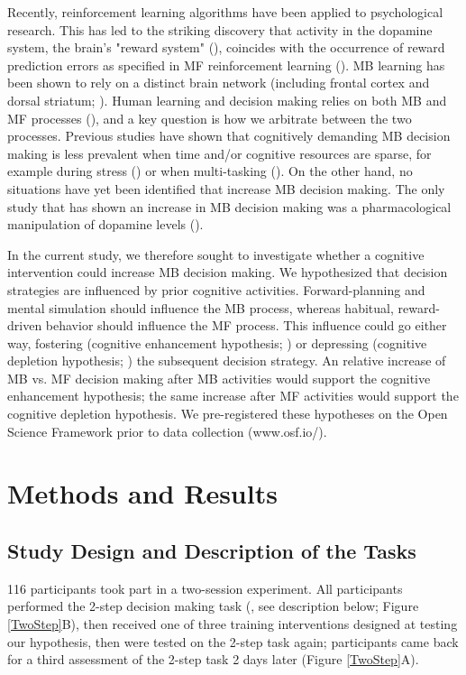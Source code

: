 \documentclass[11pt]{article} %
\begin{document}
Recently, reinforcement learning algorithms have been applied to psychological research. This has led to the striking discovery that activity in the dopamine system, the brain's "reward system" (\cite{wise_brain_1989}), coincides with the occurrence of reward prediction errors as specified in MF reinforcement learning (\cite{schultz_neural_1997}). MB learning has been shown to rely on a distinct brain network (including frontal cortex and dorsal striatum; \cite{dolan_goals_2013}). Human learning and decision making relies on both MB and MF processes (\cite{daw_model-based_2011}), and a key question is how we arbitrate between the two processes. Previous studies have shown that cognitively demanding MB decision making is less prevalent when time and/or cognitive resources are sparse, for example during stress (\cite{schwabe_stress-induced_2011}) or when multi-tasking (\cite{otto_curse_2013}). On the other hand, no situations have yet been identified that increase MB decision making. The only study that has shown an increase in MB decision making was a pharmacological manipulation of dopamine levels (\cite{wunderlich_dopamine_2012}). 

In the current study, we therefore sought to investigate whether a cognitive intervention could increase MB decision making. We hypothesized that decision strategies are influenced by prior cognitive activities. Forward-planning and mental simulation should influence the MB process, whereas habitual, reward-driven behavior should influence the MF process. This influence could go either way, fostering (cognitive enhancement hypothesis; \cite{jaeggi_short-_2011}) or depressing (cognitive depletion hypothesis; \cite{muraven_self-regulation_2000}) the subsequent decision strategy. An relative increase of MB vs. MF decision making after MB activities would support the cognitive enhancement hypothesis; the same increase after MF activities would support the cognitive depletion hypothesis. We pre-registered these hypotheses on the Open Science Framework prior to data collection (www.osf.io/).

\section{Methods and Results}
\subsection{Study Design and Description of the Tasks}

116 participants took part in a two-session experiment. All participants performed the 2-step decision making task (\cite{daw_model-based_2011}, see description below; Figure \ref{TwoStep}B), then received one of three training interventions designed at testing our hypothesis, then were tested on the 2-step task again; participants came back for a third assessment of the 2-step task 2 days later (Figure \ref{TwoStep}A).%
\end{document}
